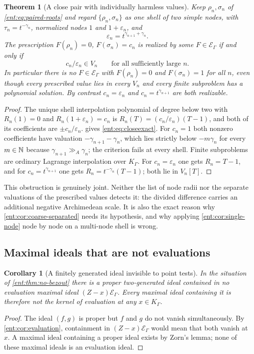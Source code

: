 \documentclass[11pt]{article}
\newtheorem{theorem}{Theorem}[section]
\theoremstyle{plain}
\theoremstyle{plain}
\theoremstyle{plain}
\newtheorem{corollary}[corollary]{Corollary}
\theoremstyle{definition}
\theoremstyle{definition}
\theoremstyle{definition}
\theoremstyle{definition}
\theoremstyle{remark}
\newcommand{\K}{K_\Gamma}\newcommand{\KD}{K_\Delta}
\newcommand{\E}{\mathcal E_\Gamma}
\newcommand{\ggA}{\mathrel{\gg_{\!A}}}
\begin{document}
\begin{theorem}[A close pair with individually harmless values]
\label{ent:thm:close-pair}
Keep $\rho_n,\sigma_n$ of \eqref{ent:eq:paired-roots} and regard
$\{\rho_n,\sigma_n\}$ as one shell of two simple nodes, with
$\tau_n=t^{-\gamma_n}$, normalized nodes $1$ and $1+\varepsilon_n$, and
\[
 \varepsilon_n=t^{\gamma_{n+1}+\gamma_n}.
\]
The prescription $F(\rho_n)=0$, $F(\sigma_n)=c_n$ is realized by some
$F\in\E$ if and only if
\begin{equation}\label{ent:eq:closeexact}
 c_n/\varepsilon_n\in V_n\qquad\text{for all sufficiently large }n .
\end{equation}
In particular there is \emph{no} $F\in\E$ with $F(\rho_n)=0$ and
$F(\sigma_n)=1$ for all $n$, even though every prescribed value lies in every
$V_n$ and every finite subproblem has a polynomial solution. By contrast
$c_n=\varepsilon_n$ and $c_n=t^{\gamma_{n+1}}$ are both realizable.
\end{theorem}
\begin{proof}
The unique shell interpolation polynomial of degree below two with
$R_n(1)=0$ and $R_n(1+\varepsilon_n)=c_n$ is
$R_n(T)=(c_n/\varepsilon_n)(T-1)$, and both of its coefficients are
$\pm c_n/\varepsilon_n$.  gives
\eqref{ent:eq:closeexact}. For $c_n=1$ both nonzero coefficients have
valuation $-\gamma_{n+1}-\gamma_n$, which lies strictly below $-m\gamma_n$
for every $m\in\mathbb N$ because $\gamma_{n+1}\ggA\gamma_n$; the criterion fails at
every shell. Finite subproblems are ordinary Lagrange interpolation over
$\K$. For $c_n=\varepsilon_n$ one gets $R_n=T-1$, and for
$c_n=t^{\gamma_{n+1}}$ one gets $R_n=t^{-\gamma_n}(T-1)$; both lie in
$V_n[T]$.
\end{proof}

This obstruction is genuinely joint. Neither the list of node radii nor the
separate valuations of the prescribed values detects it: the divided
difference carries an additional negative Archimedean scale. It is also the
exact reason why \cref{ent:cor:coarse-separated} needs its hypothesis, and
why applying \cref{ent:cor:single-node} node by node on a multi-node shell is
wrong.

\subsection{Maximal ideals that are not evaluations}
\label{ent:subsec:invisible}

\begin{corollary}[A finitely generated ideal invisible to point tests]
\label{ent:cor:invisible-ideal}
In the situation of \cref{ent:thm:no-bezout} there is a proper two-generated
ideal contained in no evaluation maximal ideal $(Z-x)\E$. Every maximal ideal
containing it is therefore not the kernel of evaluation at any $x\in\K$.
\end{corollary}
\begin{proof}
The ideal $(f,g)$ is proper but $f$ and $g$ do not vanish simultaneously. By
\cref{ent:cor:evaluation}, containment in $(Z-x)\E$ would mean that both
vanish at $x$. A maximal ideal containing a proper ideal exists by Zorn's
lemma; none of these maximal ideals is an evaluation ideal.
\end{proof}
\end{document}
